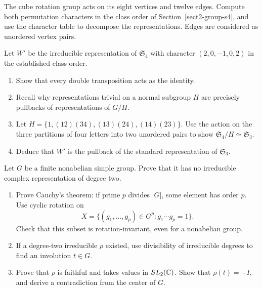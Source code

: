 \begin{exo}
\label{exo-action-face-cube}
The cube rotation group acts on its eight vertices and twelve edges.
Compute both permutation characters in the class order of
Section~\ref{sect2-group-s4}, and use the character table to decompose
the representations. Edges are considered as unordered vertex pairs.
\end{exo}


\begin{exo}
\label{exo-caracteres-s4}
Let $W'$ be the irreducible representation of $\mathfrak S_4$ with
character $(2,0,-1,0,2)$ in the established class order.
\begin{enumerate}
\item Show that every double transposition acts as the identity.
\item Recall why representations trivial on a normal subgroup $H$
are precisely pullbacks of representations of $G/H$.
\item Let $H=\{1,(12)(34),(13)(24),(14)(23)\}$. Use the action on the
three partitions of four letters into two unordered pairs to show
$\mathfrak S_4/H\simeq\mathfrak S_3$.
\item Deduce that $W'$ is the pullback of the standard representation
of $\mathfrak S_3$.
\end{enumerate}
\end{exo}


\begin{exo}
\label{exo-representation-gpe-simple}
Let $G$ be a finite nonabelian simple group. Prove that it has no
irreducible complex representation of degree two.
\begin{enumerate}
\item Prove Cauchy's theorem: if prime $p$ divides $|G|$, some element
has order $p$. Use cyclic rotation on
\[
 X=\{(g_1,\ldots,g_p)\in G^p:g_1\cdots g_p=1\}.
\]
Check that this subset is rotation-invariant, even for a nonabelian group.
\item If a degree-two irreducible $\rho$ existed, use divisibility of
irreducible degrees to find an involution $t\in G$.
\item Prove that $\rho$ is faithful and takes values in $SL_2(\mathbb{C})$.
Show that $\rho(t)=-I$, and derive a contradiction from the center of $G$.
\end{enumerate}
\end{exo}

